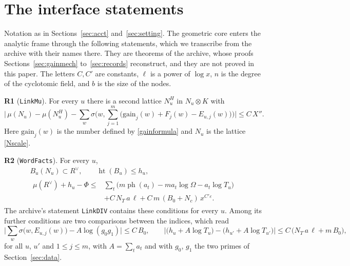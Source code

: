 \documentclass[11pt,letterpaper]{article}
\numberwithin{equation}{section}
\begin{document}
\section{The interface statements}\label{sec:remain}

Notation as in Sections~\ref{sec:acct} and~\ref{sec:setting}. The geometric core enters the analytic frame through the following statements, which we transcribe from the archive with their names there. They are theorems of the archive, whose proofs Sections~\ref{sec:gainmech} to~\ref{sec:records} reconstruct, and they are not proved in this paper. The letters $C,C'$ are constants, $\ell$ is a power of $\log x$, $n$ is the degree of the cyclotomic field, and $b$ is the size of the nodes.

\medskip\noindent\textbf{R1} (\texttt{LinkMu}). For every $u$ there is a second lattice $N^H_u$ in $N_u\otimes K$ with
\[
\Big|\,\mu(N_u)-\mu(N^H_u)-\sum_w\sigma\Big(w,\sum_{j=1}^m\big(\mathrm{gain}_j(w)+F_j(w)-E_{u,j}(w)\big)\Big)\Big|\le C\,X'' .
\]
Here $\mathrm{gain}_j(w)$ is the number defined by \eqref{gainformula} and $N_u$ is the lattice \eqref{Nscale}.

\noindent\textbf{R2} (\texttt{WordFacts}). For every $u$,
\begin{gather*}
B_u(N_u)\subset R^\vee,\qquad \operatorname{ht}(B_u)\le h_u,\\
\begin{aligned}
\mu(R^\vee)+h_u-\Phi\le{}&\sum_t\big(m\operatorname{ph}(a_t)-ma_t\log\Omega-a_t\log T_u\big)\\
&+C\,N_T\,a\,\ell+C\,m\,(B_0+N_c)\,x^{C'\varepsilon}.
\end{aligned}
\end{gather*}
The archive's statement \texttt{LinkDIV} contains these conditions for every $u$. Among its further conditions are two comparisons between the indices, which read
\[
\Big|\sum_w\sigma\big(w,E_{u,j}(w)\big)-A\log(g_0g_1)\Big|\le C\,B_0,\qquad
\Big|\big(h_u+A\log T_u\big)-\big(h_{u'}+A\log T_{u'}\big)\Big|\le C\,\big(N_T\,a\,\ell+m\,B_0\big),
\]
for all $u$, $u'$ and $1\le j\le m$, with $A=\sum_ta_t$ and with $g_0$, $g_1$ the two primes of Section~\ref{sec:data}.
\end{document}
